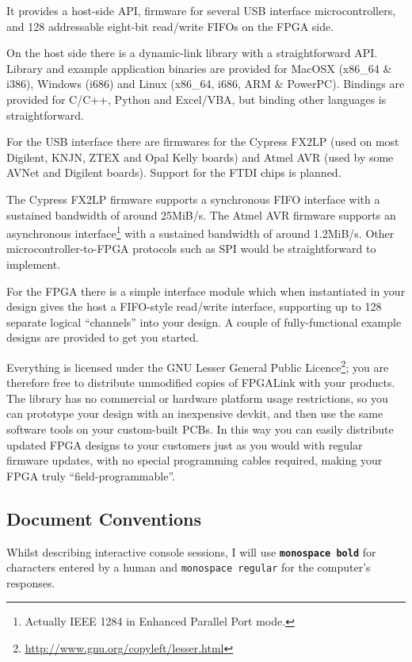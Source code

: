 It provides a host-side API, firmware for several USB interface microcontrollers, and 128 addressable eight-bit read/write FIFOs on the FPGA side.

\begin{blobs}
  \item
    On the host side there is a dynamic-link library with a straightforward API. Library and example application binaries are provided for MacOSX (x86\_64 \& i386), Windows (i686) and Linux (x86\_64, i686, ARM \& PowerPC). Bindings are provided for C/C++, Python and Excel/VBA, but binding other languages is straightforward.
  \item
    For the USB interface there are firmwares for the Cypress FX2LP (used on most Digilent, KNJN, ZTEX and Opal Kelly boards) and Atmel AVR (used by some AVNet and Digilent boards). Support for the FTDI chips is planned.
  \item
    The Cypress FX2LP firmware supports a synchronous FIFO interface with a sustained bandwidth of around 25MiB/s. The Atmel AVR firmware supports an asynchronous interface\footnote{Actually IEEE 1284 in Enhanced Parallel Port mode.} with a sustained bandwidth of around 1.2MiB/s. Other microcontroller-to-FPGA protocols such as SPI would be straightforward to implement.
  \item
    For the FPGA there is a simple interface module which when instantiated in your design gives the host a FIFO-style read/write interface, supporting up to 128 separate logical ``channels'' into your design. A couple of fully-functional example designs are provided to get you started.
\end{blobs}

Everything is licensed under the GNU Lesser General Public Licence\footnote{\url{http://www.gnu.org/copyleft/lesser.html}}; you are therefore free to distribute unmodified copies of FPGALink with your products. The library has no commercial or hardware platform usage restrictions, so you can prototype your design with an inexpensive devkit, and then use the same software tools on your custom-built PCBs. In this way you can easily distribute updated FPGA designs to your customers just as you would with regular firmware updates, with no special programming cables required, making your FPGA truly ``field-programmable''.

\subsection{Document Conventions}
Whilst describing interactive console sessions, I will use {\bf\textcolor[rgb]{0.00,0.00,0.00}{\texttt{monospace bold}}} for characters entered by a human and {\textcolor[rgb]{0.20,0.20,0.20}{\texttt{monospace regular}}} for the computer's responses.

